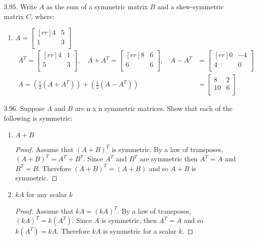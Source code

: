 \documentclass[12pt]{article}
\begin{document}
\begin{enumerate}
\item [3.95.] Write $A$ as the sum of a symmetric matrix $B$ and a skew-symmetric matrix $C$, where:
	\begin{enumerate}
	\item $A= \begin{bmatrix}[rr] 4 & 5\\ 1 & 3\\ \end{bmatrix}$\\
	\begin{align*}
	A^T = \begin{bmatrix}[rr] 4 & 1\\ 5 & 3\\ \end{bmatrix}, \quad
	A+A^T = \begin{bmatrix}[rr] 8 & 6\\ 6 & 6\\ \end{bmatrix}, \quad
	A-A^T &= \begin{bmatrix}[rr] 0 & -4\\ 4 & 0\\ \end{bmatrix}\\
	A=(\frac{1}{2}(A+A^T)) + (\frac{1}{2}(A-A^T)) 
	&= \begin{bmatrix}8 & 2\\ 10 & 6\\ \end{bmatrix} 
	\end{align*}
	\end{enumerate}
	
	
\item [3.96.] Suppose $A$ and $B$ are n x n symmetric matrices. Show that each of the following is symmetric:
	\begin{enumerate}
	\item $A+B$
	\begin{proof}
	Assume that $(A+B)^T$ is symmetric. By a law of transposes, $(A+B)^T = A^T+B^T$. Since $A^T$ and $B^T$ are symmetric then $A^T=A$ and $B^T=B$. Therefore $(A+B)^T = (A+B)$ and so $A+B$ is symmetric.
	\end{proof}
	
	\item $kA$ for any scalar $k$
	\begin{proof}
	Assume that $kA=(kA)^T$. By a law of transposes, $(kA)^T = k(A^T)$. Since $A$ is symmetric, then $A^T=A$ and so $k(A^T) = kA$. Therefore $kA$ is symmetric for a scalar $k$.
	\end{proof}		
	

\end{enumerate}
\end{enumerate}
\end{document}
